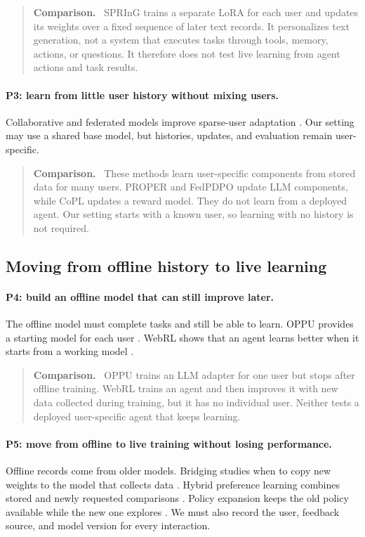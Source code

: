 \documentclass[11pt]{article}
\newenvironment{settingpointer}
  {\begin{quote}\small\noindent\textbf{Comparison.}\ }
  {\end{quote}}
\begin{document}
\begin{settingpointer}
SPRInG trains a separate LoRA for each user and updates its weights over a
fixed sequence of later text records.  It personalizes text generation, not a
system that executes tasks through tools, memory, actions, or questions.  It
therefore does not test live learning from agent actions and task results.
\end{settingpointer}

\paragraph{P3: learn from little user history without mixing users.}
Collaborative and federated models improve sparse-user adaptation
\citep{choi2025copl,zhang2025proper,zhu2026fedpdpo}.  Our setting may use a
shared base model, but histories, updates, and evaluation remain
user-specific.

\begin{settingpointer}
These methods learn user-specific components from stored data for many users.
PROPER and FedPDPO update LLM components, while CoPL updates a reward model.
They do not learn from a deployed agent.  Our setting starts with a known
user, so learning with no history is not required.
\end{settingpointer}

\subsection{Moving from offline history to live learning}

\paragraph{P4: build an offline model that can still improve later.}
The offline model must complete tasks and still be able to learn.  OPPU
provides a starting model for each user \citep{tan2024oppu}.  WebRL shows that
an agent learns better when it starts from a working model
\citep{qi2025webrl}.

\begin{settingpointer}
OPPU trains an LLM adapter for one user but stops after offline training.
WebRL trains an agent and then improves it with new data collected during
training, but it has no individual user.  Neither tests a deployed
user-specific agent that keeps learning.
\end{settingpointer}

\paragraph{P5: move from offline to live training without losing performance.}
Offline records come from older models.  Bridging studies when to copy new
weights to the model that collects data \citep{lanchantin2025bridging}.
Hybrid preference learning combines stored and newly requested comparisons
\citep{bose2024hybrid}.  Policy expansion keeps the old policy available while
the new one explores \citep{zhang2023pex}.  We must also record the user,
feedback source, and model version for every interaction.
\end{document}
